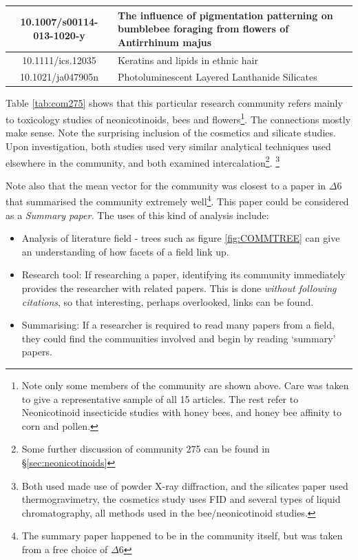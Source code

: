 \begin{table}[H]
\begin{tabular}{||c|X||}
10.1007/s00114-013-1020-y        & \footnotesize{The influence of pigmentation patterning on bumblebee foraging from flowers of Antirrhinum majus                                                                  } \\ \hline
10.1111/ics.12035                & \footnotesize{ Keratins and lipids in ethnic hair                                                                                                                                } \\ \hline
10.1021/ja047905n                & \footnotesize{Photoluminescent Layered Lanthanide Silicates                                                                                                                     } \\ \hline
\end{tabular}
\end{table}

Table \ref{tab:com275} shows that this particular research community refers mainly to toxicology studies of neonicotinoids,  bees and flowers\footnote{Note only some members of the community are shown above. Care was taken to give a representative sample of all 15 articles. The rest refer to Neonicotinoid insecticide studies with honey bees, and honey bee affinity to corn and pollen.}. The connections mostly make sense. Note the surprising inclusion of the cosmetics and silicate studies. Upon investigation, both studies used very similar analytical techniques used elsewhere in the community, and both examined intercalation\footnote{Some further discussion of community 275 can be found in \S\ref{sec:neonicotinoids}}.
\footnote{Both used made use of powder X-ray diffraction, and the silicates paper used thermogravimetry, the cosmetics study uses FID and several types of liquid chromatography, all methods used in the bee/neonicotinoid studies.}

Note also that the mean vector for the community was closest to a paper in $\Delta6$ that summarised the community extremely well\footnote{The summary paper happened to be in the community itself, but was taken from a free choice of $\Delta6$ }. This paper could be considered as a \emph{Summary paper.}
The uses of this kind of analysis include:
\begin{itemize}
\item Analysis of literature field -  trees such as figure \ref{fig:COMMTREE} can give an understanding of how facets of a field link up. 
\item Research tool: If researching a paper, identifying its community immediately provides the researcher with related papers. This is done \emph{without following citations}, so that interesting, perhaps overlooked, links can be found.
\item Summarising: If a researcher is required to read many papers from a field, they could find the communities involved and begin by reading `summary' papers. 
\end{itemize}

